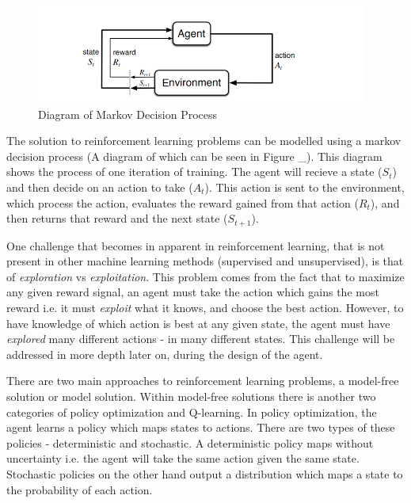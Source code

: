 \documentclass{article}
\begin{document}
    \begin{figure}
        \centering
        \includegraphics[scale =0.5]{markovprocess.png}
        \caption{Diagram of Markov Decision Process}
    \end{figure}
    The solution to reinforcement learning problems can be modelled using a markov decision process (A diagram of which can be seen in Figure _). This diagram shows the process of
    one iteration of training. The agent will recieve a state ($S_t$) and then decide on an action to take ($A_t$). This action is sent to the environment, which process the action,
    evaluates the reward gained from that action ($R_t$), and then returns that reward and the next state ($S_{t+1}$).
    
    One challenge that becomes in apparent in reinforcement learning, that is not present in other machine learning methods (supervised and unsupervised), is that of \textit{exploration}
    vs \textit{exploitation}. This problem comes from the fact that to maximize any given reward signal, an agent must take the action which gains the most reward i.e. it must
    \textit{exploit} what it knows, and choose the best action. However, to have knowledge of which action is best at any given state, the agent must have \textit{explored} many different
    actions - in many different states. This challenge will be addressed in more depth later on, during the design of the agent.

    There are two main approaches to reinforcement learning problems, a model-free solution or model solution. Within model-free solutions there is another two categories of policy optimization
    and Q-learning. In policy optimization, the agent learns a policy which maps states to actions. There are two types of these policies - deterministic and stochastic. A deterministic policy
    maps without uncertainty i.e. the agent will take the same action given the same state. Stochastic policies on the other hand output a distribution which maps a state to the probability of 
    each action.
\end{document}
